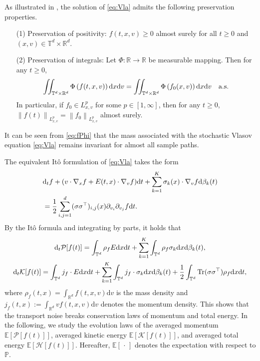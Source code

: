 \documentclass[11pt,reqno]{amsproc}
\newcommand{\ud}{\mathrm d}
\newcommand{\R}{\mathbb{R}}
\numberwithin{equation}{section}
\newcommand{\E}{\mathbb{E}}\allowdisplaybreaks[4]
\begin{document}
As illustrated in \cite[Proposition 11]{BC24}, the solution of \eqref{eq:Vla} admits the following preservation properties.
\begin{enumerate}
\item[(1)] Preservation of positivity: $f(t, x, v) \ge 0$ almost surely for all $t\ge0$ and $(x, v) \in \mathbb{T}^d \times \mathbb{R}^d$.
\item[(2)] Preservation of integrals: Let $\Phi: \R\rightarrow\R$ be measurable mapping. Then for any $t\ge0$,
\begin{align}\label{eq:fPhi}
\iint_{\mathbb{T}^d\times\mathbb{R}^d} \Phi\left(f(t, x, v)\right) \ud x \ud v=\iint_{\mathbb{T}^d\times\mathbb{R}^d} \Phi\left(f_0(x, v)\right) \ud x \ud v\quad \textup{a.s}.
\end{align}
In particular, if $f_0 \in L_{x, v}^p$ for some
$p \in[1, \infty]$, then for any $t\ge0$,
$
\left\|f(t)\right\|_{L_{x, v}^p}=\left\|f_0\right\|_{L_{x, v}^p}
$ almost surely.
\end{enumerate}
It can be seen from \eqref{eq:fPhi} that the mass associated with the stochastic Vlasov equation \eqref{eq:Vla} remains invariant for almost all sample paths. 

The equivalent It\^o formulation of \eqref{eq:Vla} takes the form
\begin{align}\label{eq:Ito}
&\ud_tf +(v\cdot \nabla_xf+E(t,x)\cdot\nabla_vf)\ud t
+\sum_{k=1}^K\sigma_k(x)\cdot\nabla_v f\ud \beta_k(t)\\\notag
&=\frac{1}{2}\sum_{i,j=1}^d(\sigma\sigma^\top)_{i,j}(x)\partial_{v_i}\partial_{v_j}f\ud t.
\end{align}
By the It\^o formula and integrating by parts, it holds that
\begin{gather}\label{eq:dtPft}
\ud_t \mathcal{P}[f(t)]=\int_{\mathbb{T}^d} \rho_f E\ud x\ud t+\sum_{k=1}^K\int_{\mathbb{T}^d} \rho_f\sigma_k\ud x\ud\beta_k(t),\\\label{eq:dtKft}
\ud_t \mathcal{K}[f(t)]=\int_{\mathbb{T}^d}j_f\cdot E\ud x\ud t
+\sum_{k=1}^K\int_{\mathbb{T}^d}j_f\cdot\sigma_k\ud x\ud \beta_k(t)+\frac12\int_{\mathbb{T}^d}\textup{Tr}(\sigma\sigma^\top)\rho_f\ud x\ud t,
\end{gather}
where $\rho_f(t,x)=\int_{\R^d}f(t,x,v)\ud v$ is the mass density and $j_f(t,x):=\int_{\R^d}vf(t,x,v)\ud v$ denotes the momentum density. This shows that the transport noise breaks conservation laws of momentum and total energy. In the following, we study the evolution laws of the averaged momentum $\E[\mathcal{P}[f(t)]]$, averaged kinetic energy $\E[\mathcal{K}[f(t)]]$, and averaged total energy $\E[\mathcal{H}[f(t)]]$. Hereafter, $\E[\,\cdot\,]$ denotes the expectation with respect to $\mathbb{P}$.
\end{document}
